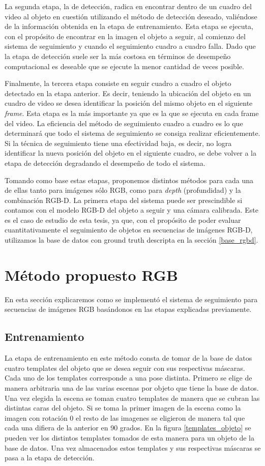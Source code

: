 La segunda etapa, la de detección, radica en encontrar dentro de un cuadro del video al objeto en cuestión utilizando el método de detección deseado, valiéndose de la información obtenida en la etapa de entrenamiento. Esta etapa se ejecuta, con el propósito de encontrar en la imagen el objeto a seguir, al comienzo del sistema de seguimiento y cuando el seguimiento cuadro a cuadro falla. Dado que la etapa de detección suele ser la más costosa en términos de desempeño computacional es deseable que se ejecute la menor cantidad de veces posible.

Finalmente, la tercera etapa consiste en seguir cuadro a cuadro el objeto detectado en la etapa anterior. Es decir, teniendo la ubicación del objeto en un cuadro de video se desea identificar la posición del mismo objeto en el siguiente \textit{frame}. Esta etapa es la más importante ya que es la que se ejecuta en cada frame del video. La eficiencia del método de seguimiento cuadro a cuadro es lo que determinará que todo el sistema de seguimiento se consiga realizar eficientemente. Si la técnica de seguimiento tiene una efectividad baja, es decir, no logra identificar la nueva posición del objeto en el siguiente cuadro, se debe volver a la etapa de detección degradando el desempeño de todo el sistema.

Tomando como base estas etapas, proponemos distintos métodos para cada una de ellas tanto para imágenes sólo RGB, como para \textit{depth} (profundidad) y la combinación RGB-D. La primera etapa del sistema puede ser prescindible si contamos con el modelo RGB-D del objeto a seguir y una cámara calibrada. Este es el caso de estudio de esta tesis, ya que, con el propósito de poder evaluar cuantitativamente el seguimiento de objetos en secuencias de imágenes RGB-D, utilizamos la base de datos con ground truth descripta en la sección \ref{base_rgbd}.

\section{Método propuesto RGB}\label{metodo_rgb}
En esta sección explicaremos como se implementó el sistema de seguimiento para secuencias de imágenes RGB basándonos en las etapas explicadas previamente.

\subsection{Entrenamiento}
La etapa de entrenamiento en este método consta de tomar de la base de datos cuatro templates del objeto que se desea seguir con sus respectivas máscaras. Cada uno de los templates corresponde a una pose distinta. Primero se elige de manera arbitraria una de las varias escenas por objeto que tiene la base de datos. Una vez elegida la escena se toman cuatro templates de manera que se cubran las distintas caras del objeto. Si se toma la primer imagen de la escena como la imagen con rotación 0 el resto de las imagenes se eligieron de manera tal que cada una difiera de la anterior en 90 grados. En la figura \ref{templates_objeto} se pueden ver los distintos templates tomados de esta manera para un objeto de la base de datos. Una vez almacenados estos templates y sus respectivas máscaras se pasa a la etapa de detección.

